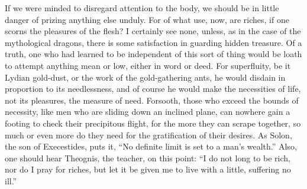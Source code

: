 \documentclass[a4paper]{article}
\begin{document}
If we were minded to disregard attention to the body, we should be in little danger of prizing anything else unduly. For of what use, now, are riches, if one scorns the pleasures of the flesh? I certainly see none, unless, as in the case of the mythological dragons, there is some satisfaction in guarding hidden treasure. Of a truth, one who had learned to be independent of this sort of thing would be loath to attempt anything mean or low, either in word or deed. For superfluity, be it Lydian gold-dust, or the work of the gold-gathering ants, he would disdain in proportion to its needlessness, and of course he would make the necessities of life, not its pleasures, the measure of need. Forsooth, those who exceed the bounds of necessity, like men who are sliding down an inclined plane, can nowhere gain a footing to check their precipitous flight, for the more they can scrape together, so much or even more do they need for the gratification of their desires. As Solon, the son of Execestides, puts it, ``No definite limit is set to a man's wealth.'' Also, one should hear Theognis, the teacher, on this point: ``I do not long to be rich, nor do I pray for riches, but let it be given me to live with a little, suffering no ill.'' 
\end{document}
